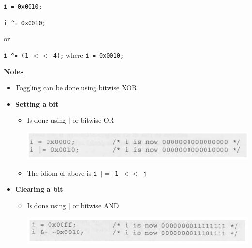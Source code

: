 \documentclass[12pt]{article}
\begin{document}
\begin{enumerate}[1.]
\begin{enumerate}[a)]
\begin{mdframed}
\begin{itemize}
            \texttt{i = 0x0010;}

            \texttt{i \^{}= 0x0010;}

            \bigskip

            or

            \bigskip

            \texttt{i \^{}= (1 $<<$ 4);} where \texttt{i = 0x0010;}
        \end{itemize}

        \end{mdframed}

        \bigskip

        \underline{\textbf{Notes}}

        \begin{itemize}
            \item Toggling can be done using bitwise XOR


            \item \textbf{Setting a bit}

            \begin{itemize}
                \item Is done using $\vert$ or bitwise OR

                \begin{center}
                \includegraphics[width=\linewidth]{images/review_9_solution_3.png}
                \end{center}

                \item The idiom of above is \texttt{i $\lvert=$ 1 $<<$ j}
            \end{itemize}

            \item \textbf{Clearing a bit}

            \begin{itemize}
                \item Is done using $\vert$ or bitwise AND

                \begin{center}
                \includegraphics[width=\linewidth]{images/review_9_solution_5.png}
                \end{center}


\end{itemize}
\end{itemize}
\end{enumerate}
\end{enumerate}
\end{document}
